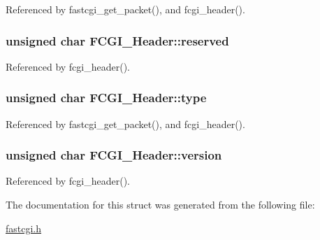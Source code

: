 Referenced by fastcgi\-\_\-get\-\_\-packet(), and fcgi\-\_\-header().

\hypertarget{structFCGI__Header_ac8196d4f373fb5ec71636ce2e4cc859b}{
\subsubsection[{reserved}]{\setlength{\rightskip}{0pt plus 5cm}unsigned char F\-C\-G\-I\-\_\-\-Header\-::reserved}}\label{structFCGI__Header_ac8196d4f373fb5ec71636ce2e4cc859b}


Referenced by fcgi\-\_\-header().

\hypertarget{structFCGI__Header_a19d813d810077c13638890f0ea0710f8}{
\subsubsection[{type}]{\setlength{\rightskip}{0pt plus 5cm}unsigned char F\-C\-G\-I\-\_\-\-Header\-::type}}\label{structFCGI__Header_a19d813d810077c13638890f0ea0710f8}


Referenced by fastcgi\-\_\-get\-\_\-packet(), and fcgi\-\_\-header().

\hypertarget{structFCGI__Header_ad1bf48caf468a7251b419453502a4f52}{
\subsubsection[{version}]{\setlength{\rightskip}{0pt plus 5cm}unsigned char F\-C\-G\-I\-\_\-\-Header\-::version}}\label{structFCGI__Header_ad1bf48caf468a7251b419453502a4f52}


Referenced by fcgi\-\_\-header().



The documentation for this struct was generated from the following file\-:\begin{DoxyCompactItemize}
\item 
\hyperlink{fastcgi_8h}{fastcgi.\-h}\end{DoxyCompactItemize}
